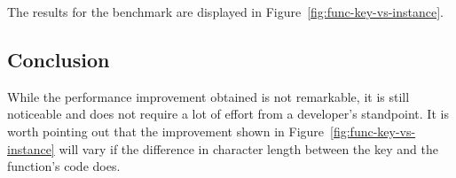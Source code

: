 The results for the benchmark are displayed in Figure~\ref{fig:func-key-vs-instance}.

\subsection{Conclusion}
While the performance improvement obtained is not remarkable, it is still noticeable and does not require a lot of effort from a developer's standpoint. It is worth pointing out that the improvement shown in Figure~\ref{fig:func-key-vs-instance} will vary if the difference in character length between the key and the function's code does.

\pagebreak